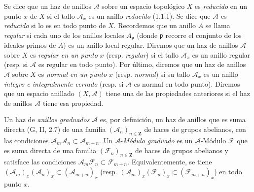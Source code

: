 \begin{env}[4.1.4]
\label{0.4.1.4-fr}
Se dice que un haz de anillos $\mathcal{A}$ sobre un espacio topológico $X$
es \emph{reducido} en un punto $x$ de $X$ si el tallo $\mathcal{A}_x$ es un
anillo \emph{reducido} (1.1.1). Se dice que $\mathcal{A}$ es \emph{reducido}
si lo es en todo punto de $X$. Recordemos que un anillo $A$ se llama
\emph{regular} si cada uno de los anillos locales $A_{\mathfrak p}$ (donde
$\mathfrak p$ recorre el conjunto de los ideales primos de $A$) es un anillo
local regular. Diremos que un haz de anillos $\mathcal{A}$ sobre $X$
es \emph{regular en un punto} $x$ (resp. \emph{regular}) si el tallo
$\mathcal{A}_x$ es un anillo regular (resp. si $\mathcal{A}$ es regular
en todo punto). Por último, diremos que un haz de anillos $\mathcal{A}$ sobre
$X$ es \emph{normal en un punto} $x$ (resp. \emph{normal}) si su tallo
$\mathcal{A}_x$ es un anillo \emph{íntegro e integralmente cerrado} (resp. si
$\mathcal{A}$ es normal en todo punto). Diremos que un espacio anillado
$(X,\mathcal{A})$ tiene una de las propiedades anteriores si el haz de anillos
$\mathcal{A}$ tiene esa propiedad.

Un haz de \emph{anillos graduados} $\mathcal{A}$ es, por definición, un
haz de anillos que es suma directa (G, II, 2.7) de una familia
$(\mathcal{A}_n)_{n\in\mathbf Z}$ de haces de grupos abelianos, con las
condiciones $\mathcal{A}_m\mathcal{A}_n\subset\mathcal{A}_{m+n}$. Un
$\mathcal{A}$-\emph{Módulo graduado} es un $\mathcal{A}$-Módulo
$\mathcal{F}$ que es suma directa de una familia
$(\mathcal{F}_n)_{n\in\mathbf Z}$ de haces de grupos abelianos y satisface
las condiciones $\mathcal{A}_m\mathcal{F}_n\subset\mathcal{F}_{m+n}$. Equivalentemente,
se tiene
$(\mathcal{A}_m)_x(\mathcal{A}_n)_x\subset(\mathcal{A}_{m+n})_x$
(resp.
$(\mathcal{A}_m)_x(\mathcal{F}_n)_x\subset(\mathcal{F}_{m+n})_x$)
en todo punto $x$.
\end{env}
